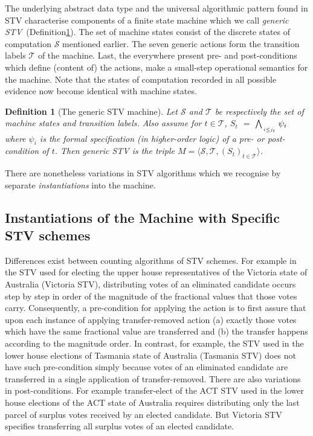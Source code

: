 \documentclass[10pt,conference]{IEEEtran}
\newtheorem{definition}{Definition}
\newtheorem{remark}{Remark}
\begin{document}
The underlying abstract data type and the universal algorithmic pattern found in STV characterise components of a finite state machine which we call \emph{generic STV}~(Definition\ref{STVMachine}). The set of machine states consist of the discrete states of computation $\mathcal{S}$ mentioned earlier. The seven generic actions form the transition labels $\mathcal{T}$ of the machine. Last, the everywhere present pre- and post-conditions which define (content of)  the actions, make a small-step operational semantics for the machine.
Note that the states of computation recorded in all possible  evidence now become identical with machine states.

\begin{definition}[The generic STV machine]\label{STVMachine}
Let $\mathcal{S}$  and $\mathcal{T}$
be respectively the set of machine states and transition labels.  Also assume for $t\in\mathcal{T}$, $S_{t}$ $=$ $\bigwedge_{\atop{i\leq j_{t}}} \psi_{i}$ where  $\psi_{i}$ is the formal specification (in higher-order logic) of a pre- or post-condition of $t$. Then \emph{generic STV} is the triple $M = \langle \mathcal{S}, \mathcal{T}, (S_t)_{t \in \mathcal{T}} \rangle$. 
\end{definition}
There are nonetheless variations in STV algorithms  which we  recognise  by separate \emph{instantiations} into the machine.  
\subsection{Instantiations of the Machine with Specific STV schemes}
Differences exist between counting algorithms of STV schemes.  
 For example in the STV used for electing the upper house representatives of the Victoria state of Australia (Victoria STV), distributing votes of an eliminated candidate occurs step by step in order of the magnitude of the fractional values that those votes carry.  Consequently, a pre-condition for applying the action is to first assure that upon each instance of applying transfer-removed action (a) exactly those votes which have the same fractional value are transferred and (b) the transfer happens according to the magnitude order. In contrast, for example, the STV used in the lower house elections of Tasmania state of Australia (Tasmania STV) does not have such pre-condition simply because votes of an eliminated candidate are transferred in a single application of transfer-removed. There are also variations in post-conditions. For example transfer-elect of the ACT STV used in the lower house elections of the ACT state of Australia requires distributing only the last parcel of surplus votes received by an elected candidate. But Victoria STV specifies transferring all surplus votes of an elected candidate.  
\end{document}
